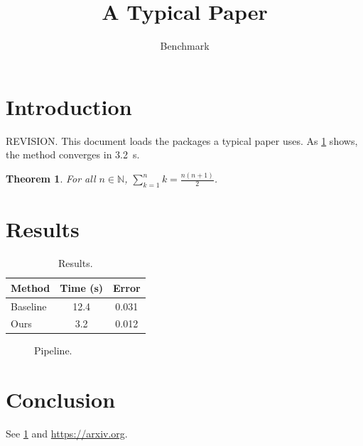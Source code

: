 \documentclass[11pt]{article}
\title{A Typical Paper}
\author{Benchmark}
\newtheorem{theorem}{Theorem}
\begin{document}
\maketitle

\section{Introduction}\label{sec:intro}
REVISION. This document loads the packages a typical paper uses. As
\cref{thm:main} shows, the method converges in \SI{3.2}{\second}.

\begin{theorem}\label{thm:main}
For all $n \in \mathbb{N}$, $\sum_{k=1}^{n} k = \frac{n(n+1)}{2}$.
\end{theorem}

\section{Results}
\begin{table}[h]
  \centering
  \begin{tabular}{lSS}
    \toprule
    Method & {Time (\si{\second})} & {Error} \\
    \midrule
    Baseline & 12.4 & 0.031 \\
    Ours     & 3.2  & 0.012 \\
    \bottomrule
  \end{tabular}
  \caption{Results.}
\end{table}

\begin{figure}[h]
  \centering
  \caption{Pipeline.}
\end{figure}

\section{Conclusion}
See \cref{sec:intro} and \url{https://arxiv.org}.
\end{document}
